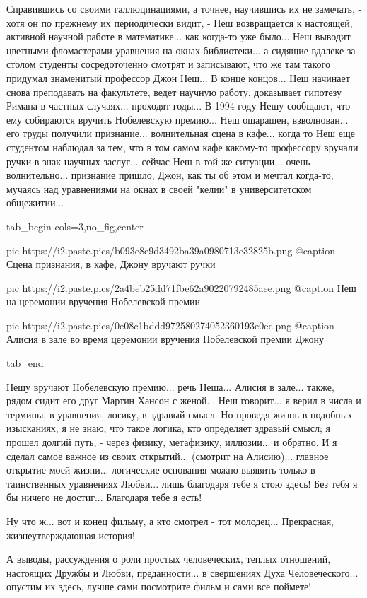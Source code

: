 Справившись со своими галлюцинациями, а точнее, научившись их не замечать, -
хотя он по прежнему их периодически видит, - Неш возвращается к настоящей,
активной научной работе в математике... как когда-то уже было...  Неш выводит
цветными фломастерами уравнения на окнах библиотеки... а сидящие вдалеке за
столом студенты сосредоточенно смотрят и записывают, что же там такого придумал
знаменитый профессор Джон Неш...  В конце концов... Неш начинает снова
преподавать на факультете, ведет научную работу, доказывает гипотезу Римана в
частных случаях... проходят годы...  В 1994 году Нешу сообщают, что ему
собираются вручить Нобелевскую премию...  Неш ошарашен, взволнован... его труды
получили признание... волнительная сцена в кафе...  когда то Неш еще студентом
наблюдал за тем, что в том самом кафе какому-то профессору вручали ручки в знак
научных заслуг... сейчас Неш в той же ситуации... очень волнительно...
признание пришло, Джон, как ты об этом и мечтал когда-то, мучаясь над
уравнениями на окнах в своей "келии" в университетском общежитии...

\ifcmt
  tab_begin cols=3,no_fig,center

     pic https://i2.paste.pics/b093e8e9d3492ba39a0980713e32825b.png
		 @caption Сцена признания, в кафе, Джону вручают ручки

		 pic https://i2.paste.pics/2a4beb25dd71fbe62a90220792485aee.png
		 @caption Неш на церемонии вручения Нобелевской премии

		 pic https://i2.paste.pics/0e08c1bddd972580274052360193e0ec.png
		 @caption Алисия в зале во время церемонии вручения Нобелевской премии Джону

  tab_end
\fi

Нешу вручают Нобелевскую премию... речь Неша... Алисия в зале... также, рядом
сидит его друг Мартин Хансон с женой...  Неш говорит... я верил в числа и
термины, в уравнения, логику, в здравый смысл. Но проведя жизнь в подобных
изысканиях, я не знаю, что такое логика, кто определяет здравый смысл; я прошел
долгий путь, - через физику, метафизику, иллюзии...  и обратно. И я сделал
самое важное из своих открытий... (смотрит на Алисию)... главное открытие моей
жизни...  логические основания можно выявить только в таинственных уравнениях
Любви... лишь благодаря тебе я стою здесь!  Без тебя я бы ничего не достиг...
Благодаря тебе я есть!

Ну что ж... вот и конец фильму, а кто смотрел - тот молодец...  Прекрасная,
жизнеутверждающая история! 

А выводы, рассуждения о роли простых человеческих, теплых отношений, настоящих
Дружбы и Любви, преданности... в свершениях Духа Человеческого...  опустим их
здесь, лучше сами посмотрите фильм и сами все поймете!





